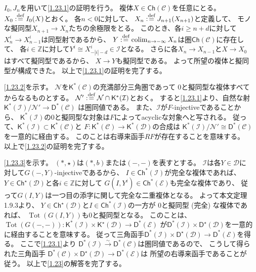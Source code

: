 \documentclass[uplatex,dvipdfmx]{jsarticle}
\makeatletter
\theoremstyle{definition}
\renewenvironment{proof}[1][\proofname]{
  \pushQED{\qed}%
  \normalfont \topsep6\p@\@plus6\p@\relax
  \trivlist
  \item[\hskip\labelsep
    #1\@addpunct{\textbf{.}}]\ignorespaces
}{%
  \popQED\endtrivlist\@endpefalse
}
\providecommand{\proofname}{証明}
\DeclareMathOperator{\Tot}{\mathrm{Tot}}
\DeclareMathOperator{\colim}{\mathrm{colim}}
\newcommand{\Ch}{\mathsf{Ch}}
\newcommand{\sfK}{\mathsf{K}}
\newcommand{\sfD}{\mathsf{D}}
\newcommand\Z{\mathbb{Z}}
\newcommand\mcC{\mathcal{C}}
\newcommand\mcD{\mathcal{D}}
\newcommand\mcE{\mathcal{E}}
\newcommand\mcI{\mathcal{I}}
\newcommand\mcN{\mathcal{N}}
\def\dfn{:\overset{\mbox{{\scriptsize def}}}{=}}
\makeatother
\begin{document}
\begin{proof}
  \(I_0,J_n\)を用いて\ref{1.23.1}の証明を行う。
  複体\(X\in \Ch(\mcC)\)を任意にとる。
  \(X_0\dfn I_0(X)\)とおく。
  各\(n < 0\)に対して、
  \(X_n\dfn J_{n+1}(X_{n+1})\)と定義して、
  モノな擬同型\(X_{n+1}\to X_n\)たちの余極限をとる。
  このとき、各\(i\geq n+d\)に対して\(X_n^i \to X_{n-1}^i\)は同型射であるから、
  \(Y \dfn \colim_{n\to -\infty}X_n\)は圏\(\Ch(\mcC)\)に存在して、
  各\(i\in \Z\)に対して\(Y^i\cong X_{-|i|-d}^i\in \mcI\)となる。
  さらに各\(X_n\to X_{n-1}\)と\(X\to X_0\)はすべて擬同型であるから、
  \(X\to Y\)も擬同型である。
  よって所望の複体と擬同型が構成できた。
  以上で\ref{1.23.1}の証明を完了する。

  \ref{1.23.2}を示す。
  \(\mcN\)を\(\sfK^*(\mcC)\)の充満部分三角圏であって
  \(0\)と擬同型な複体すべてからなるものとする。
  \(\mcN'\dfn \mcN \cap \sfK^*(\mcI)\)とおく。
  すると\ref{1.23.1}より、自然な射
  \(\sfK^*(\mcI)/\mcN' \to \sfD^*(\mcC)\)
  は圏同値である。
  また、\(\mcI\)が\(F\)-injectiveであることから、
  \(\sfK^*(\mcI)\)の\(0\)と擬同型な対象は\(F\)によってacyclicな対象へと写される。
  従って、\(\sfK^*(\mcI) \subset \sfK^*(\mcC)\)と
  \(F:\sfK^*(\mcC)\to \sfK^*(\mcD)\)の合成は
  \(\sfK^*(\mcI)/\mcN'\cong \sfD^*(\mcC)\)を一意的に経由する。
  このことは右導来函手\(RF\)が存在することを意味する。
  以上で\ref{1.23.2}の証明を完了する。

  \ref{1.23.3}を示す。
  \((*,\star)\)は\((*,b)\)または\((-,-)\)を表すとする。
  \(\mcI\)は各\(Y\in \mcD\)に対して\(G(-,Y)\)-injectiveであるから、
  \(I\in \Ch^*(\mcI)\)が完全な複体であれば、
  \(Y\in \Ch^{\star}(\mcD)\)と各\(i\in \Z\)に対して
  \(G(I,Y^i)\in \Ch^*(\mcE)\)も完全な複体であり、
  従って\(G(I,Y)\)は一つ目の添字に関して完全な二重複体となる。
  よって本文定理1.9.3より、
  \(Y\in \Ch^{\star}(\mcD)\)と\(I\in \Ch^*(\mcI)\)の一方が
  \(0\)と擬同型 (完全) な複体であれば、
  \(\Tot(G(I,Y))\)も\(0\)と擬同型となる。
  このことは、
  \(\Tot(G(-,-)):\sfK^*(\mcI) \times \sfK^{\star}(\mcD) \to \sfD^*(\mcE)\)
  が\(\sfD^*(\mcI) \times \sfD^{\star}(\mcD)\)を一意的に経由することを意味する。
  従って三角函手\(\sfD^*(\mcI) \times \sfD^{\star}(\mcD)\to \sfD^*(\mcE)\)を得る。
  ここで\ref{1.23.1}より
  \(\sfD^*(\mcI)\xrightarrow{\sim} \sfD^*(\mcC)\)は圏同値であるので、
  こうして得られた三角函手
  \(\sfD^*(\mcC)\times \sfD^{\star}(\mcD)\to \sfD^*(\mcE)\)は
  所望の右導来函手であることが従う。
  以上で\autoref{1.23}の解答を完了する。
\end{proof}
\end{document}
